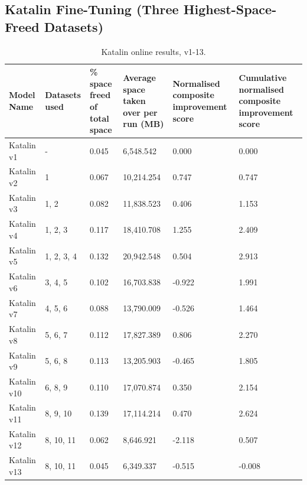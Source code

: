 \documentclass{article}
\begin{document}
\subsection[Katalin Fine-Tuning (Three Highest-Space-Freed Datasets)]{Katalin Fine-Tuning (Three Highest-Space-\\Freed Datasets)}
\begin{table}[H]
\centering
\setlength{\tabcolsep}{3pt}
\renewcommand{\arraystretch}{1.3}
\footnotesize
\begin{tabularx}{\textwidth}{|L|L|L|L|L|L|}
    \hline
    \textbf{Model Name} & 
    \textbf{Datasets used} & 
    \textbf{\% space freed of total space} & 
    \textbf{Average space taken over per run (MB)} & 
    \textbf{Normalised composite improvement score} & 
    \textbf{Cumulative normalised composite improvement score} \\ 
    \hline
    Katalin v1 & - & 0.045 & 6,548.542 & 0.000 & 0.000 \\ 
    \hline
    Katalin v2 & 1 & 0.067 & 10,214.254 & 0.747 & 0.747 \\ 
    \hline
    Katalin v3 & 1, 2 & 0.082 & 11,838.523 & 0.406 & 1.153 \\ 
    \hline
    Katalin v4 & 1, 2, 3 & 0.117 & 18,410.708 & 1.255 & 2.409 \\ 
    \hline
    Katalin v5 & 1, 2, 3, 4 & 0.132 & 20,942.548 & 0.504 & 2.913 \\ 
    \hline
    Katalin v6 & 3, 4, 5 & 0.102 & 16,703.838 & -0.922 & 1.991 \\ 
    \hline
    Katalin v7 & 4, 5, 6 & 0.088 & 13,790.009 & -0.526 & 1.464 \\
    \hline
    Katalin v8 & 5, 6, 7 & 0.112 & 17,827.389 & 0.806 & 2.270 \\
    \hline
    Katalin v9 & 5, 6, 8 & 0.113 & 13,205.903 & -0.465 & 1.805 \\
    \hline
    Katalin v10 & 6, 8, 9 & 0.110 & 17,070.874 & 0.350 & 2.154 \\
    \hline
    Katalin v11 & 8, 9, 10 & 0.139 & 17,114.214 & 0.470 & 2.624 \\
    \hline
    Katalin v12 & 8, 10, 11 & 0.062 & 8,646.921 & -2.118 & 0.507 \\
    \hline
    Katalin v13 & 8, 10, 11 & 0.045 & 6,349.337 & -0.515 & -0.008 \\
    \hline
\end{tabularx}
\caption{Katalin online results, v1-13.}
\label{tab:katalin_online_metrics}
\end{table}
\end{document}
